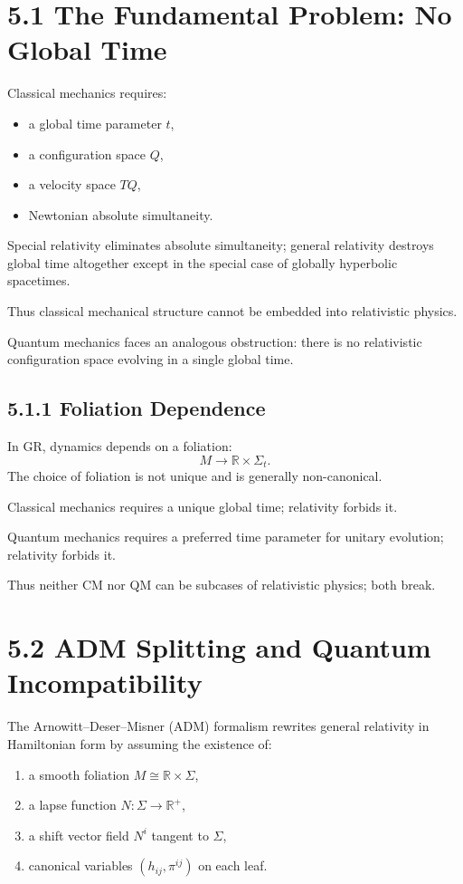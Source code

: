 \documentclass[12pt,oneside]{book}
\theoremstyle{plain}
\theoremstyle{definition}
\begin{document}
\section{5.1 The Fundamental Problem: No Global Time}

Classical mechanics requires:

\begin{itemize}
\item a global time parameter $t$,
\item a configuration space $Q$,
\item a velocity space $TQ$,
\item Newtonian absolute simultaneity.
\end{itemize}

Special relativity eliminates absolute simultaneity; general relativity destroys global time altogether except in the special case of globally hyperbolic spacetimes.

Thus classical mechanical structure cannot be embedded into relativistic physics.

Quantum mechanics faces an analogous obstruction:  
there is no relativistic configuration space evolving in a single global time.

\subsection{5.1.1 Foliation Dependence}

In GR, dynamics depends on a foliation:
\[
M \to \mathbb{R} \times \Sigma_t.
\]
The choice of foliation is not unique and is generally non-canonical.

Classical mechanics requires a unique global time; relativity forbids it.

Quantum mechanics requires a preferred time parameter for unitary evolution; relativity forbids it.

Thus neither CM nor QM can be subcases of relativistic physics; both break.



\section{5.2 ADM Splitting and Quantum Incompatibility}

The Arnowitt–Deser–Misner (ADM) formalism rewrites general relativity in Hamiltonian form by assuming the existence of:

\begin{enumerate}
\item a smooth foliation $M \cong \mathbb{R} \times \Sigma$,  
\item a lapse function $N : \Sigma \to \mathbb{R}^+$,  
\item a shift vector field $N^i$ tangent to $\Sigma$,  
\item canonical variables $(h_{ij},\pi^{ij})$ on each leaf.
\end{enumerate}
\end{document}
